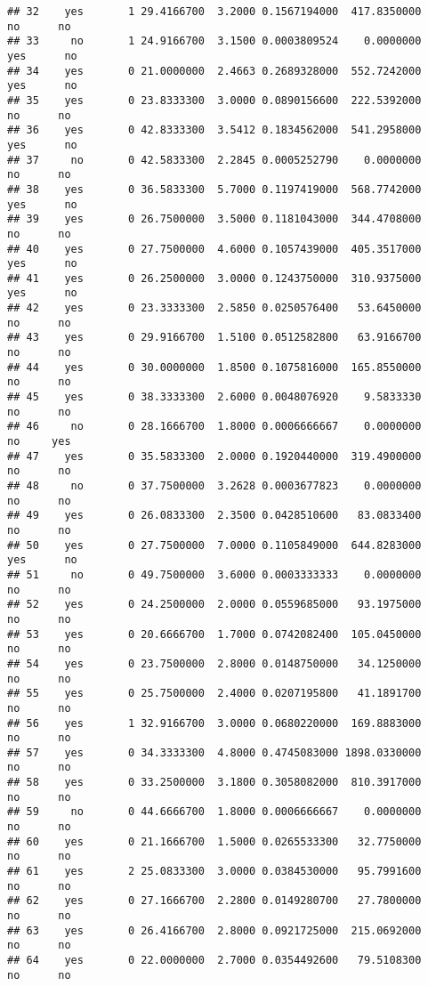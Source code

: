 \documentclass[]{article}
\begin{document}
\begin{verbatim}
## 32    yes       1 29.4166700  3.2000 0.1567194000  417.8350000    no      no
## 33     no       1 24.9166700  3.1500 0.0003809524    0.0000000   yes      no
## 34    yes       0 21.0000000  2.4663 0.2689328000  552.7242000   yes      no
## 35    yes       0 23.8333300  3.0000 0.0890156600  222.5392000    no      no
## 36    yes       0 42.8333300  3.5412 0.1834562000  541.2958000   yes      no
## 37     no       0 42.5833300  2.2845 0.0005252790    0.0000000    no      no
## 38    yes       0 36.5833300  5.7000 0.1197419000  568.7742000   yes      no
## 39    yes       0 26.7500000  3.5000 0.1181043000  344.4708000    no      no
## 40    yes       0 27.7500000  4.6000 0.1057439000  405.3517000   yes      no
## 41    yes       0 26.2500000  3.0000 0.1243750000  310.9375000   yes      no
## 42    yes       0 23.3333300  2.5850 0.0250576400   53.6450000    no      no
## 43    yes       0 29.9166700  1.5100 0.0512582800   63.9166700    no      no
## 44    yes       0 30.0000000  1.8500 0.1075816000  165.8550000    no      no
## 45    yes       0 38.3333300  2.6000 0.0048076920    9.5833330    no      no
## 46     no       0 28.1666700  1.8000 0.0006666667    0.0000000    no     yes
## 47    yes       0 35.5833300  2.0000 0.1920440000  319.4900000    no      no
## 48     no       0 37.7500000  3.2628 0.0003677823    0.0000000    no      no
## 49    yes       0 26.0833300  2.3500 0.0428510600   83.0833400    no      no
## 50    yes       0 27.7500000  7.0000 0.1105849000  644.8283000   yes      no
## 51     no       0 49.7500000  3.6000 0.0003333333    0.0000000    no      no
## 52    yes       0 24.2500000  2.0000 0.0559685000   93.1975000    no      no
## 53    yes       0 20.6666700  1.7000 0.0742082400  105.0450000    no      no
## 54    yes       0 23.7500000  2.8000 0.0148750000   34.1250000    no      no
## 55    yes       0 25.7500000  2.4000 0.0207195800   41.1891700    no      no
## 56    yes       1 32.9166700  3.0000 0.0680220000  169.8883000    no      no
## 57    yes       0 34.3333300  4.8000 0.4745083000 1898.0330000    no      no
## 58    yes       0 33.2500000  3.1800 0.3058082000  810.3917000    no      no
## 59     no       0 44.6666700  1.8000 0.0006666667    0.0000000    no      no
## 60    yes       0 21.1666700  1.5000 0.0265533300   32.7750000    no      no
## 61    yes       2 25.0833300  3.0000 0.0384530000   95.7991600    no      no
## 62    yes       0 27.1666700  2.2800 0.0149280700   27.7800000    no      no
## 63    yes       0 26.4166700  2.8000 0.0921725000  215.0692000    no      no
## 64    yes       0 22.0000000  2.7000 0.0354492600   79.5108300    no      no

\end{verbatim}
\end{document}
